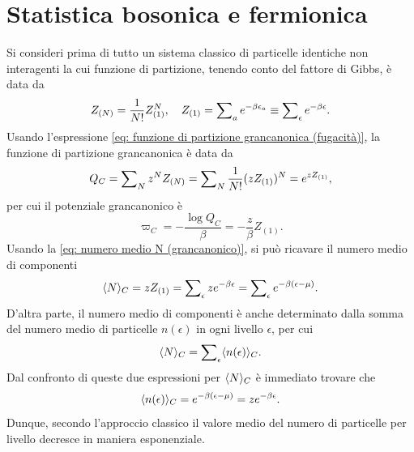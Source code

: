 \chapter{Statistica bosonica e fermionica}
Si consideri prima di tutto un sistema classico di particelle identiche non interagenti la cui funzione di partizione, tenendo conto del fattore di Gibbs, è data da
\begin{equation}
    Z_{(N)} = \frac{1}{N!}Z_{(1)}^N, \quad Z_{(1)} = \sum\nolimits_{a}e^{-\beta\epsilon_a} \equiv \sum\nolimits_\epsilon e^{-\beta\epsilon}.
\end{equation}
Usando l'espressione \eqref{eq: funzione di partizione grancanonica (fugacità)}, la funzione di partizione grancanonica è data da
\begin{equation}
    Q_{C} = \sum\nolimits_Nz^NZ_{(N)} = \sum\nolimits_N\frac{1}{N!}(zZ_{(1)})^N = e^{zZ_{(1)}},
\end{equation}
per cui il potenziale grancanonico è
\begin{equation}
    \varpi_{C} = -\frac{\log{Q_{C}}}{\beta} = -\frac{z}{\beta}Z_{(1)}.
\end{equation}
Usando la \eqref{eq: numero medio N (grancanonico)}, si può ricavare il numero medio di componenti 
\begin{equation}
    \langle N \rangle_{C} = zZ_{(1)} = \sum\nolimits_\epsilon ze^{-\beta\epsilon} = \sum\nolimits_\epsilon e^{-\beta(\epsilon - \mu)}.
\end{equation}
D'altra parte, il numero medio di componenti è anche determinato dalla somma del numero medio di particelle $n(\epsilon)$ in ogni livello $\epsilon$, per cui
\begin{equation}
    \langle N \rangle_{C} = \sum\nolimits_\epsilon \langle n(\epsilon) \rangle_{C}.
\end{equation}
Dal confronto di queste due espressioni per $\langle N \rangle_{C}$ è immediato trovare che
\begin{equation}
    \langle n(\epsilon) \rangle_{C} = e^{-\beta(\epsilon - \mu)} = ze^{-\beta\epsilon}.
\end{equation}
Dunque, secondo l'approccio classico il valore medio del numero di particelle per livello decresce in maniera esponenziale. 


